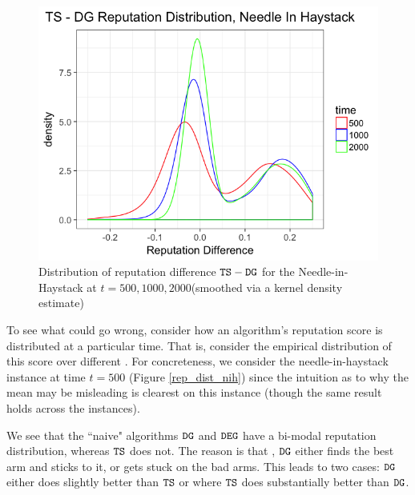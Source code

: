 \documentclass[../competing_bandits.tex]{subfiles}
\begin{document}
\begin{figure}[ht]
\includegraphics[scale=0.35]{figures/ts_dg_rep_diff_nih}
\caption{Distribution of reputation difference $\mathtt{TS}-\mathtt{DG}$ for the Needle-in-Haystack at $t = 500, 1000, 2000$(smoothed via a kernel density estimate)}
\label{ts_dg_rep_diff_nih}
\end{figure}

To see what could go wrong, consider how an algorithm's reputation score is distributed at a particular time. That is, consider the empirical distribution of this score over different \MRVs. For concreteness, we consider the needle-in-haystack instance at time $t=500$ (Figure \ref{rep_dist_nih}) since the intuition as to why the mean may be misleading is clearest on this instance (though the same result holds across the instances).

We see that the ``naive" algorithms $\mathtt{DG}$ and $\mathtt{DEG}$ have a bi-modal reputation distribution, whereas $\mathtt{TS}$ does not. The reason is that , $\mathtt{DG}$ either finds the best arm and sticks to it, or gets stuck on the bad arms. This leads to two cases: $\mathtt{DG}$ either does slightly better than $\mathtt{TS}$ or where $\mathtt{TS}$ does substantially better than $\mathtt{DG}$.
\end{document}
